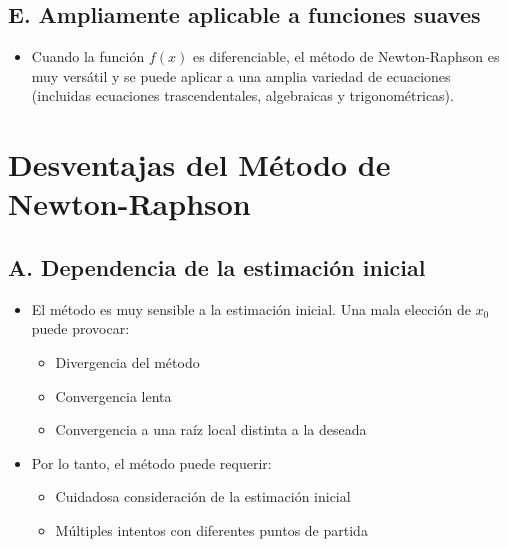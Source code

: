\documentclass[conference]{IEEEtran}
\begin{document}
\subsection*{E. Ampliamente aplicable a funciones suaves}
\begin{itemize}
    \item Cuando la función $f(x)$ es diferenciable, el método de Newton-Raphson es muy versátil y se puede aplicar a una amplia variedad de ecuaciones (incluidas ecuaciones trascendentales, algebraicas y trigonométricas).

 \end{itemize}

\section*{Desventajas del Método de Newton-Raphson}

\subsection*{A. Dependencia de la estimación inicial}
\begin{itemize}
    \item El método es muy sensible a la estimación inicial. Una mala elección de $x_0$ puede provocar:
    \begin{itemize}
        \item Divergencia del método
        \item Convergencia lenta
        \item Convergencia a una raíz local distinta a la deseada
    \end{itemize}
    \item Por lo tanto, el método puede requerir:
    \begin{itemize}
        \item Cuidadosa consideración de la estimación inicial
        \item Múltiples intentos con diferentes puntos de partida
    \end{itemize}
\end{itemize}
\end{document}
